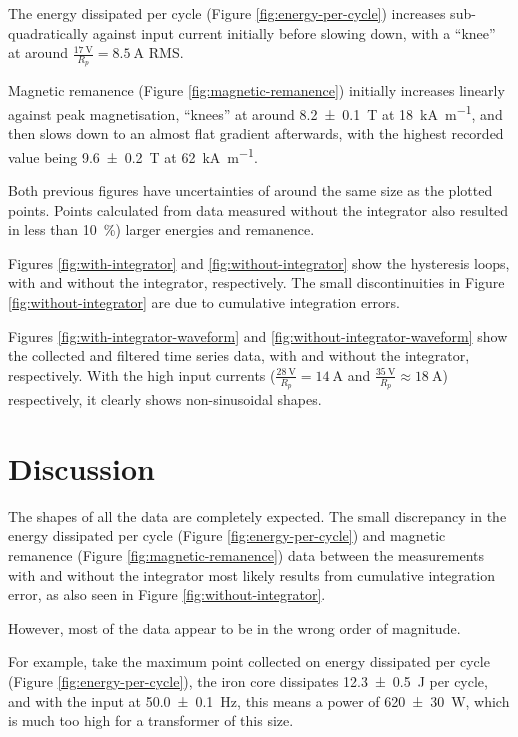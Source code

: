 \documentclass[a4paper]{scrartcl}
\begin{document}
The energy dissipated per cycle (Figure \ref{fig:energy-per-cycle}) increases sub-quadratically against input current initially before slowing down, with a ``knee'' at around \(\frac{\SI{17}{\volt}}{R_p} = \SI{8.5}{\ampere}\) RMS.

Magnetic remanence (Figure \ref{fig:magnetic-remanence}) initially increases linearly against peak magnetisation, ``knees'' at around \SI{8.2 \pm 0.1}{\tesla} at \SI{18}{\kilo\ampere\per\metre}, and then slows down to an almost flat gradient afterwards, with the highest recorded value being \SI{9.6 \pm 0.2}{\tesla} at \SI{62}{\kilo\ampere\per\metre}.

Both previous figures have uncertainties of around the same size as the plotted points. Points calculated from data measured without the integrator also resulted in less than \SI{10}{\percent}) larger energies and remanence.

Figures \ref{fig:with-integrator} and \ref{fig:without-integrator} show the hysteresis loops, with and without the integrator, respectively. The small discontinuities in Figure \ref{fig:without-integrator} are due to cumulative integration errors.

Figures \ref{fig:with-integrator-waveform} and \ref{fig:without-integrator-waveform} show the collected and filtered time series data, with and without the integrator, respectively. With the high input currents (\(\frac{\SI{28}{\volt}}{R_p} = \SI{14}{\ampere}\) and \(\frac{\SI{35}{\volt}}{R_p} \approx \SI{18}{\ampere}\)) respectively, it clearly shows non-sinusoidal shapes.

\section{Discussion}
The shapes of all the data are completely expected. The small discrepancy in the energy dissipated per cycle (Figure \ref{fig:energy-per-cycle}) and magnetic remanence (Figure \ref{fig:magnetic-remanence}) data between the measurements with and without the integrator most likely results from cumulative integration error, as also seen in Figure \ref{fig:without-integrator}.

However, most of the data appear to be in the wrong order of magnitude.

For example, take the maximum point collected on energy dissipated per cycle (Figure \ref{fig:energy-per-cycle}), the iron core dissipates \SI{12.3 \pm 0.5}{\joule} per cycle, and with the input at \SI{50.0 \pm 0.1}{\hertz}, this means a power of \SI{620 \pm 30}{\watt}, which is much too high for a transformer of this size.
\end{document}
